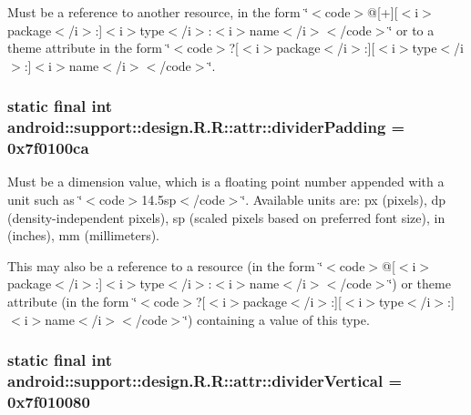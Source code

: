 Must be a reference to another resource, in the form \char`\"{}$<$code$>$@\mbox{[}+\mbox{]}\mbox{[}$<$i$>$package$<$/i$>$:\mbox{]}$<$i$>$type$<$/i$>$:$<$i$>$name$<$/i$>$$<$/code$>$\char`\"{} or to a theme attribute in the form \char`\"{}$<$code$>$?\mbox{[}$<$i$>$package$<$/i$>$:\mbox{]}\mbox{[}$<$i$>$type$<$/i$>$:\mbox{]}$<$i$>$name$<$/i$>$$<$/code$>$\char`\"{}. \hypertarget{classandroid_1_1support_1_1design_1_1_r_1_1attr_7dcd06dfa4e130e88e1627d61379cd81}{
\subsubsection[{dividerPadding}]{\setlength{\rightskip}{0pt plus 5cm}static final int android::support::design.R.R::attr::dividerPadding = 0x7f0100ca}}
\label{classandroid_1_1support_1_1design_1_1_r_1_1attr_7dcd06dfa4e130e88e1627d61379cd81}


Must be a dimension value, which is a floating point number appended with a unit such as \char`\"{}$<$code$>$14.5sp$<$/code$>$\char`\"{}. Available units are: px (pixels), dp (density-independent pixels), sp (scaled pixels based on preferred font size), in (inches), mm (millimeters). 

This may also be a reference to a resource (in the form \char`\"{}$<$code$>$@\mbox{[}$<$i$>$package$<$/i$>$:\mbox{]}$<$i$>$type$<$/i$>$:$<$i$>$name$<$/i$>$$<$/code$>$\char`\"{}) or theme attribute (in the form \char`\"{}$<$code$>$?\mbox{[}$<$i$>$package$<$/i$>$:\mbox{]}\mbox{[}$<$i$>$type$<$/i$>$:\mbox{]}$<$i$>$name$<$/i$>$$<$/code$>$\char`\"{}) containing a value of this type. \hypertarget{classandroid_1_1support_1_1design_1_1_r_1_1attr_0ad8bd5954aecbab1c44943248475eac}{
\subsubsection[{dividerVertical}]{\setlength{\rightskip}{0pt plus 5cm}static final int android::support::design.R.R::attr::dividerVertical = 0x7f010080}}
\label{classandroid_1_1support_1_1design_1_1_r_1_1attr_0ad8bd5954aecbab1c44943248475eac}


